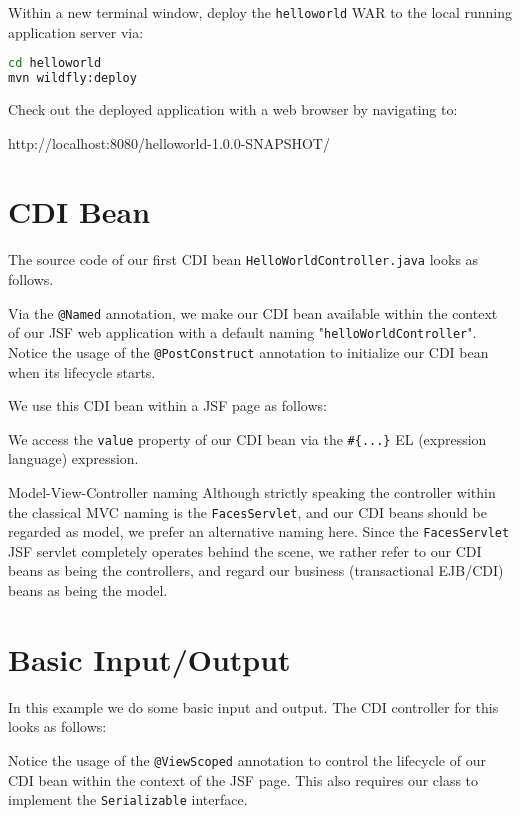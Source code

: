 Within a new terminal window, deploy the \texttt{helloworld} WAR to the local running application server via:
\begin{lstlisting}[language=bash]
cd helloworld
mvn wildfly:deploy
\end{lstlisting}

Check out the deployed application with a web browser by navigating to:

http://localhost:8080/helloworld-1.0.0-SNAPSHOT/

\section{CDI Bean}

The source code of our first CDI \cite{CDI2} bean \texttt{HelloWorldController.java} looks as follows.

Via the \texttt{@Named} annotation, we make our CDI bean available within the context of our JSF web application with a default naming "\texttt{helloWorldController}".
Notice the usage of the \texttt{@PostConstruct} annotation to initialize our CDI bean when its lifecycle starts.

We use this CDI bean within a JSF page as follows:

We access the \texttt{value} property of our CDI bean via the \texttt{\#\{...\}} EL (expression language) expression.

\begin{TIP}{Model-View-Controller naming}
	Although strictly speaking the controller within the classical MVC naming is the \texttt{FacesServlet}, and our CDI beans should be regarded as model,
	we prefer an alternative naming here.
	Since the \texttt{FacesServlet} JSF servlet completely operates behind the scene, we rather refer to our CDI beans as being the controllers,
	and regard our business (transactional EJB/CDI) beans as being the model.
\end{TIP}

\section{Basic Input/Output}
\label{sec:basic-input-output}

In this example we do some basic input and output.
The CDI controller for this looks as follows:

Notice the usage of the \texttt{@ViewScoped} annotation to control the lifecycle of our CDI bean within the context of the JSF page.
This also requires our class to implement the \texttt{Serializable} interface.


